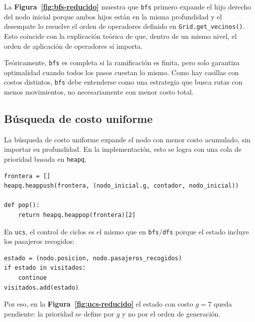 \documentclass[12pt,a4paper]{article}
\begin{document}
La \textbf{Figura~\ref{fig:bfs-reducido}} muestra que \texttt{bfs} primero expande el hijo derecho del nodo inicial porque ambos hijos están en la misma profundidad y el desempate lo resuelve el orden de operadores definido en \texttt{Grid.get\_vecinos()}. Esto coincide con la explicación teórica de que, dentro de un mismo nivel, el orden de aplicación de operadores sí importa.

Teóricamente, \texttt{bfs} es completa si la ramificación es finita, pero solo garantiza optimalidad cuando todos los pasos cuestan lo mismo. Como hay casillas con costos distintos, \texttt{bfs} debe entenderse como una estrategia que busca rutas con menos movimientos, no necesariamente con menor costo total.

\subsection{Búsqueda de costo uniforme}
La búsqueda de costo uniforme expande el nodo con menor costo acumulado, sin importar su profundidad. En la implementación, esto se logra con una cola de prioridad basada en \texttt{heapq}.

\begin{lstlisting}[style=pythonstyle,caption={Implementación de UCS (cola de prioridad por g)}]
frontera = []
heapq.heappush(frontera, (nodo_inicial.g, contador, nodo_inicial))

def pop():
    return heapq.heappop(frontera)[2]
\end{lstlisting}

En \texttt{ucs}, el control de ciclos es el mismo que en \texttt{bfs}/\texttt{dfs} porque el estado incluye los pasajeros recogidos:

\begin{lstlisting}[style=pythonstyle,caption={Control de ciclos en UCS}]
estado = (nodo.posicion, nodo.pasajeros_recogidos)
if estado in visitados:
    continue
visitados.add(estado)
\end{lstlisting}

Por eso, en la \textbf{Figura~\ref{fig:ucs-reducido}} el estado con costo \(g=7\) queda pendiente: la prioridad se define por \(g\) y no por el orden de generación.
\end{document}
